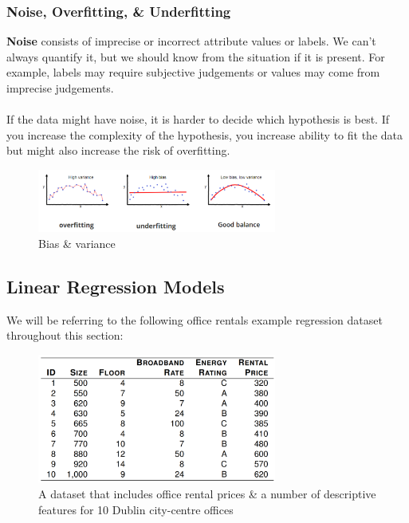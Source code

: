 \documentclass[a4paper,11pt]{article}
\begin{document}
\subsubsection{Noise, Overfitting, \& Underfitting}
\textbf{Noise} consists of imprecise or incorrect attribute values or labels.
We can't always quantify it, but we should know from the situation if it is present.
For example, labels may require subjective judgements or values may come from imprecise judgements.
\\\\
If the data might have noise, it is harder to decide which hypothesis is best.
If you increase the complexity of the hypothesis, you increase ability to fit the data but might also increase the risk of overfitting.

\begin{figure}[H]
    \centering
    \includegraphics[width=0.7\textwidth]{images/biasvariance.png}
    \caption{Bias \& variance}
\end{figure}

\subsection{Linear Regression Models}
We will be referring to the following office rentals example regression dataset throughout this section:
\begin{figure}[H]
    \centering
    \includegraphics[width=0.7\textwidth]{images/regressiondataset.png}
    \caption{A dataset that includes office rental prices \& a number of descriptive features for 10 Dublin city-centre offices}
\end{figure}
\end{document}
